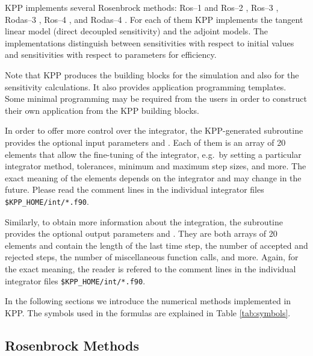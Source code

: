 \documentclass[twoside]{article}
\begin{document}
KPP implements several Rosenbrock methods: Ros--1 and Ros--2
\citep{Verwer99}, Ros--3 \citep{BENCHMARK-2}, Rodas--3
\citep{BENCHMARK-2}, Ros--4 \citep{k:HW2}, and Rodas--4 \citep{k:HW2}.
For each of them KPP implements the tangent linear model (direct
decoupled sensitivity) and the adjoint models. The implementations
distinguish between sensitivities with respect to initial values and
sensitivities with respect to parameters for efficiency.

Note that KPP produces the building blocks for the simulation and also
for the sensitivity calculations. It also provides application
programming templates. Some minimal programming may be required from the
users in order to construct their own application from the KPP building
blocks.

In order to offer more control over the integrator, the KPP-generated
subroutine  provides the optional input parameters
 and . Each of them is an array of 20
elements that allow the fine-tuning of the integrator, e.g.\ by setting
a particular integrator method, tolerances, minimum and maximum step
sizes, and more. The exact meaning of the elements depends on the
integrator and may change in the future. Please read the comment lines
in the individual integrator files \verb|$KPP_HOME/int/*.f90|.

Similarly, to obtain more information about the integration, the
subroutine  provides the optional output parameters
 and . They are both arrays of 20
elements and contain the length of the last time step, the number of
accepted and rejected steps, the number of miscellaneous function calls,
and more. Again, for the exact meaning, the reader is refered to the
comment lines in the individual integrator files
\verb|$KPP_HOME/int/*.f90|.

In the following sections we introduce the numerical methods
implemented in KPP. The symbols used in the formulas are
explained in Table \ref{tab:symbols}.

\subsection{Rosenbrock Methods}
\end{document}
